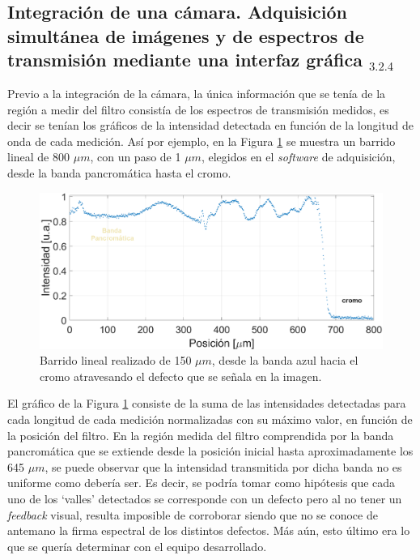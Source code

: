 

\singlespacing
\subsection{Integración de una cámara. Adquisición simultánea de imágenes y de espectros de transmisión mediante una interfaz gráfica \href{https://github.com/jrr1984/defectsGUI}{\faGithub$_{3.2.4}$}}
\label{sec:camwebgui}

\hspace{0.5cm}Previo a la integración de la cámara, la única información que se tenía de la región a medir del filtro consistía de los espectros de transmisión medidos, es decir se tenían los gráficos de la intensidad detectada en función de la longitud de onda de cada medición. Así por ejemplo, en la Figura \ref{fig:muchossi} se muestra un barrido lineal de  800 $\mu m$, con un paso de 1 $\mu m$, elegidos en el \textit{software} de adquisición, desde la banda pancromática hasta el cromo. 

 \begin{figure}[H]
	\centering
	\includegraphics[width=1.0\textwidth]{Figs/microespectrometro/defectosmuchossinvis.png}
	\caption{Barrido lineal realizado de 150 $\mu m$, desde la banda azul hacia el cromo atravesando el defecto que se señala en la imagen.}
	\label{fig:muchossi}
\end{figure}

El gráfico de la Figura \ref{fig:muchossi} consiste de la suma de las intensidades detectadas para cada longitud de cada medición normalizadas con su máximo valor, en función de la posición del filtro. En la región medida del filtro comprendida por la banda pancromática que se extiende desde la posición inicial hasta aproximadamente los 645 $\mu m$, se puede observar que la intensidad transmitida por dicha banda no es uniforme como debería ser. Es decir, se podría tomar como hipótesis que cada uno de los `valles' detectados se corresponde con un defecto pero al no tener un \textit{feedback} visual, resulta imposible de corroborar siendo que no se conoce de antemano la firma espectral de los distintos defectos. Más aún, esto último era lo que se quería determinar con el equipo desarrollado.  

